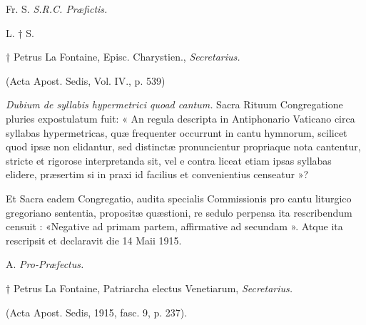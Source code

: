 \documentclass[vesperale_romanum.tex]{subfiles}
\begin{document}
\hfill{Fr. S.  \textit{S.R.C. Præfictis.}}

L. † S.

{\hfill † Petrus La Fontaine, Episc. Charystien., \textit{Secretarius.}}

(Acta Apost. Sedis, Vol. IV., p. 539)
\vspace{5ex}%

{\centering{}\par} %

{}

\textit{Dubium de syllabis hypermetrici quoad cantum.} Sacra Rituum Congregatione pluries expostulatum fuit: « An regula descripta in Antiphonario Vaticano circa syllabas hypermetricas, quæ frequenter occurrunt in cantu hymnorum, scilicet quod ipsæ non elidantur, sed distinctæ pronuncientur propriaque nota cantentur, stricte et rigorose interpretanda sit, vel e contra liceat etiam ipsas syllabas elidere, præsertim si in praxi id facilius et convenientius censeatur »?

Et Sacra eadem Congregatio, audita specialis Commissionis pro cantu liturgico gregoriano sententia, propositæ quæstioni, re sedulo perpensa ita rescribendum censuit : «Negative ad primam partem, affirmative ad secundam ». Atque ita rescripsit et declaravit die 14 Maii 1915.

\hfill{A.   \textit{Pro-Præfectus.}}

{\hfill† Petrus La Fontaine, Patriarcha electus Venetiarum, \textit{Secretarius.}}

(Acta Apost. Sedis, 1915, fasc. 9, p. 237).

\newpage

\raggedbottom

\setlength{\defaultparskip}{\parskip}
\setlength{\parskip}{0.5\baselineskip plus 2pt}

\begingroup
\setlength{\parindent}{0pt}

{\par} \thispagestyle{empty}  \nopagebreak \par \nopagebreak\vspace{5mm}\label{kalendarium} %
\setlength\LTleft{0pt}
\setlength\LTright{0pt}
\setlength{\tabcolsep}{5pt}
\renewcommand{\arraystretch}{1.4}
\fontsize{8}{9}\selectfont
\end{document}
